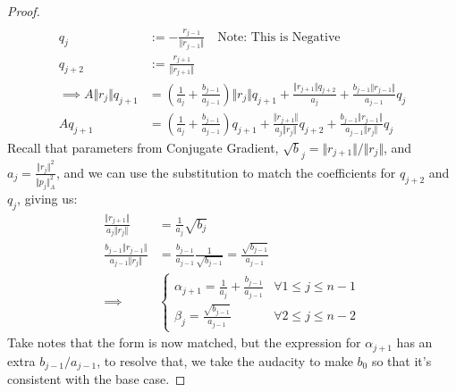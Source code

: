 \documentclass[]{article}
\theoremstyle{definition}
\begin{document}
\begin{appendices}
\begin{proof}
\begin{align}
                        \\
                        q_{j} &:= -\frac{r_{j - 1}}{\Vert r_{j - 1}\Vert} \quad 
                        \text{Note: This is Negative}
                        \\
                        q_{j + 2} &:= \frac{r_{j + 1}}{\Vert r_{j + 1}\Vert}
                        \\
                        \implies 
                        A\Vert r_j\Vert q_{j + 1} 
                        &= 
                        \left(
                            \frac{1}{a_j} + \frac{b_{j - 1}}{a_{j - 1}}
                        \right)\Vert r_j\Vert q_{j + 1}
                        + 
                        \frac{\Vert r_{j + 1}\Vert q_{j + 2}}{a_j}
                        +
                        \frac{b_{j - 1}\Vert r_{j - 1}\Vert}{a_{j - 1}}q_{j}
                        \\
                        Aq_{j + 1} &= 
                        \left(
                            \frac{1}{a_j} + \frac{b_{j - 1}}{a_{j - 1}} 
                        \right)
                        q_{j + 1}
                        + 
                        \frac{\Vert r_{j + 1}\Vert}{a_j \Vert r_j\Vert}q_{j + 2} + 
                        \frac{b_{j - 1}\Vert r_{j - 1}\Vert}{a_{j - 1}\Vert r_j\Vert}q_j
                    \end{align}
                    Recall that parameters from Conjugate Gradient, $\sqrt b_j = \Vert r_{j + 1}\Vert/\Vert r_j\Vert$, and $a_j = \frac{\Vert r_j\Vert^2}{\Vert p_j\Vert_A^2}$, and we can use the substitution to match the coefficients for $q_{j + 2}$ and $q_j$, giving us: 
                    \begin{align}
                        \frac{\Vert r_{j + 1}\Vert}{a_j\Vert r_j\Vert} &= 
                        \frac{1}{a_j}\sqrt{b_j}
                        \\
                        \frac{b_{j - 1}\Vert r_{j - 1}\Vert}{a_{j - 1}\Vert r_j \Vert}
                        &= 
                        \frac{b_{j - 1}}{a_{j - 1}}\frac{1}{\sqrt{b_{j - 1}}}
                        = 
                        \frac{\sqrt{b_{j - 1}}}{a_{j - 1}}
                        \\
                        \implies& 
                        \begin{cases}
                            \alpha_{j + 1} = \frac{1}{a_j} + \frac{b_{j - 1}}{a_{j - 1}}
                            & \forall 1 \le j \le n - 1
                            \\
                            \beta_{j} = \frac{\sqrt{b_{j - 1}}}{a_{j - 1}}
                            & \forall 2 \le j \le n - 2 
                        \end{cases}
                    \end{align}
                    Take notes that the form is now matched, but the expression for $\alpha_{j + 1}$ has an extra $b_{j - 1}/a_{j - 1}$, to resolve that, we take the audacity to make $b_0$ so that it's consistent with the base case. 
                \end{proof}

\end{appendices}
\end{document}
